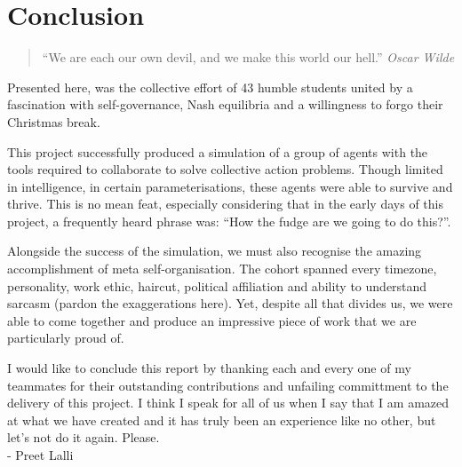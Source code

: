 \chapter{Conclusion}


\begin{flushleft}
    \begin{quote}
        ``We are each our own devil, and we make this world our hell.''
        \linebreak
        \emph{Oscar Wilde}
    \end{quote}
\end{flushleft}

Presented here, was the collective effort of 43 humble students united by a fascination with self-governance, Nash equilibria and a willingness to forgo their Christmas break. 

This project successfully produced a simulation of a group of agents with the tools required to collaborate to solve collective action problems. Though limited in intelligence, in certain parameterisations, these agents were able to survive and thrive. This is no mean feat, especially considering that in the early days of this project, a frequently heard phrase was: ``How the fudge are we going to do this?''.

Alongside the success of the simulation, we must also recognise the amazing accomplishment of meta self-organisation. The cohort spanned every timezone, personality, work ethic, haircut, political affiliation and ability to understand sarcasm (pardon the exaggerations here). Yet, despite all that divides us, we were able to come together and produce an impressive piece of work that we are particularly proud of. 

I would like to conclude this report by thanking each and every one of my teammates for their outstanding contributions and unfailing committment to the delivery of this project. I think I speak for all of us when I say that I am amazed at what we have created and it has truly been an experience like no other, but let's not do it again. Please. \\
- Preet Lalli
